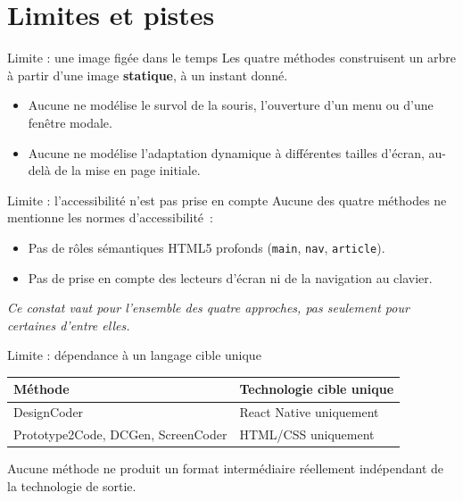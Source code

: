 \documentclass[11pt]{beamer}
\begin{document}
\section{Limites et pistes}

\begin{frame}{Limite : une image figée dans le temps}
Les quatre méthodes construisent un arbre à partir d'une image \textbf{statique}, à un instant donné.
\begin{itemize}
\item Aucune ne modélise le survol de la souris, l'ouverture d'un menu ou d'une fenêtre modale.
\item Aucune ne modélise l'adaptation dynamique à différentes tailles d'écran, au-delà de la mise en page initiale.
\end{itemize}
\end{frame}

\begin{frame}{Limite : l'accessibilité n'est pas prise en compte}
Aucune des quatre méthodes ne mentionne les normes d'accessibilité~:
\begin{itemize}
\item Pas de rôles sémantiques HTML5 profonds (\texttt{main}, \texttt{nav}, \texttt{article}).
\item Pas de prise en compte des lecteurs d'écran ni de la navigation au clavier.
\end{itemize}
\small\textit{Ce constat vaut pour l'ensemble des quatre approches, pas seulement pour certaines d'entre elles.}
\end{frame}

\begin{frame}{Limite : dépendance à un langage cible unique}
\begin{center}
\small
\begin{tabular}{ll}
\toprule
\textbf{Méthode} & \textbf{Technologie cible unique} \\
\midrule
DesignCoder & React Native uniquement \\
Prototype2Code, DCGen, ScreenCoder & HTML/CSS uniquement \\
\bottomrule
\end{tabular}
\end{center}
\vspace{0.3cm}
Aucune méthode ne produit un format intermédiaire réellement indépendant de la technologie de sortie.
\end{frame}
\end{document}
